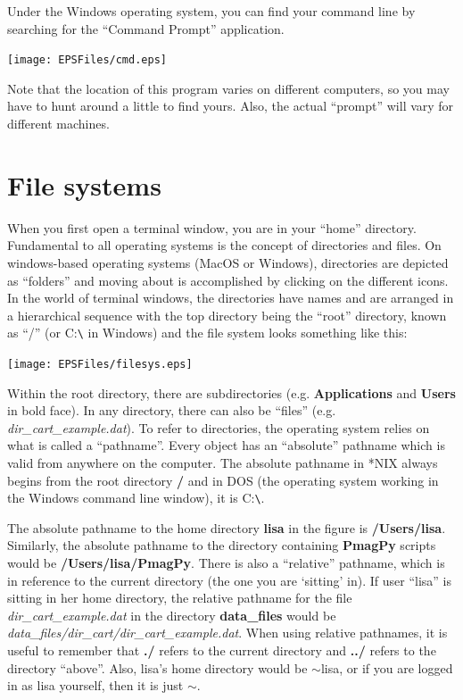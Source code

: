 \documentclass[11pt]{book}
\begin{document}
{{Under the Windows operating system, you can find your command line by searching for the ``Command Prompt'' application.

  \texttt{[image: EPSFiles/cmd.eps]}

  Note that the location of this program varies on different computers, so you may have to hunt around a little to find yours. Also, the actual  ``prompt'' will vary for different machines.



\section{File systems}
\label{sect:file_systems}
When you first open a terminal window,  you are in your ``home'' directory.
Fundamental to all operating systems is the concept of
directories and files.  On windows-based operating systems (MacOS or Windows), directories are depicted
as ``folders'' and moving about is accomplished by clicking on the different icons.
In the world of terminal windows, the directories have names and are arranged in a hierarchical sequence with
the top directory being the ``root'' directory, known as  ``/'' (or C:\verb!\! in Windows) and the file system looks something like this:


  \texttt{[image: EPSFiles/filesys.eps]}

 Within the root directory, there are subdirectories
(e.g. {\bf Applications} and {\bf Users} in bold face).  In any directory, there can also be ``files''
(e.g. {\it dir\_cart\_example.dat}).   To
refer to directories,  the operating system relies on what is called a ``pathname''. Every object
has an ``absolute'' pathname which is valid from anywhere on the computer.  The
absolute pathname in *NIX always begins from the root directory {\bf /} and in DOS (the operating system working in the Windows command line window), it is C:\verb!\!.

The absolute pathname to the home directory {\bf lisa} in the figure is {\bf /Users/lisa}.
Similarly, the absolute pathname to the directory containing {\bf PmagPy}
scripts  would be  {\bf /Users/lisa/PmagPy}.  There is also a ``relative'' pathname,
which is in reference to the  current directory (the one you are `sitting' in).  If user ``lisa'' is sitting in
her home directory, the relative pathname for the file {\it dir\_cart\_example.dat} in the directory
{\bf data\_files} would be {\it data\_files/dir\_cart/dir\_cart\_example.dat}.  When using relative
pathnames, it is useful to remember that {\bf ./} refers to the current
directory and {\bf ../} refers to the directory  ``above''.     Also, lisa's home directory would be $\sim$lisa, or if you are logged in as lisa yourself, then it is just $\sim$.


}}
\end{document}
